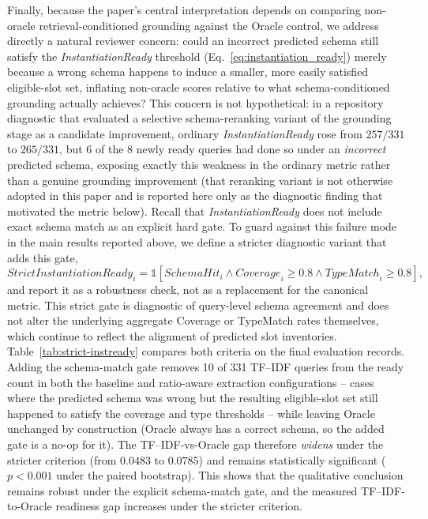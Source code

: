 \documentclass[3p]{elsarticle}
\begin{document}
Finally, because the paper's central interpretation depends on comparing non-oracle retrieval-conditioned grounding against the Oracle control, we address directly a natural reviewer concern: could an incorrect predicted schema still satisfy the \textit{InstantiationReady} threshold (Eq.~\eqref{eq:instantiation_ready}) merely because a wrong schema happens to induce a smaller, more easily satisfied eligible-slot set, inflating non-oracle scores relative to what schema-conditioned grounding actually achieves? This concern is not hypothetical: in a repository diagnostic that evaluated a selective schema-reranking variant of the grounding stage as a candidate improvement, ordinary \textit{InstantiationReady} rose from $257/331$ to $265/331$, but $6$ of the $8$ newly ready queries had done so under an \emph{incorrect} predicted schema, exposing exactly this weakness in the ordinary metric rather than a genuine grounding improvement (that reranking variant is not otherwise adopted in this paper and is reported here only as the diagnostic finding that motivated the metric below). Recall that \textit{InstantiationReady} does not include exact schema match as an explicit hard gate. To guard against this failure mode in the main results reported above, we define a stricter diagnostic variant that adds this gate,
\begin{equation}
\mathit{StrictInstantiationReady}_i = \mathbb{1}\!\left[\mathit{SchemaHit}_i \wedge \mathit{Coverage}_i \geq 0.8 \wedge \mathit{TypeMatch}_i \geq 0.8\right],
\label{eq:strict_instantiation_ready}
\end{equation}
and report it as a robustness check, not as a replacement for the canonical metric. This strict gate is diagnostic of query-level schema agreement and does not alter the underlying aggregate Coverage or TypeMatch rates themselves, which continue to reflect the alignment of predicted slot inventories. Table~\ref{tab:strict-instready} compares both criteria on the final evaluation records. Adding the schema-match gate removes 10 of 331 TF--IDF queries from the ready count in both the baseline and ratio-aware extraction configurations -- cases where the predicted schema was wrong but the resulting eligible-slot set still happened to satisfy the coverage and type thresholds -- while leaving Oracle unchanged by construction (Oracle always has a correct schema, so the added gate is a no-op for it). The TF--IDF-vs-Oracle gap therefore \emph{widens} under the stricter criterion (from $0.0483$ to $0.0785$) and remains statistically significant ($p<0.001$ under the paired bootstrap). This shows that the qualitative conclusion remains robust under the explicit schema-match gate, and the measured TF--IDF-to-Oracle readiness gap increases under the stricter criterion.
\end{document}
